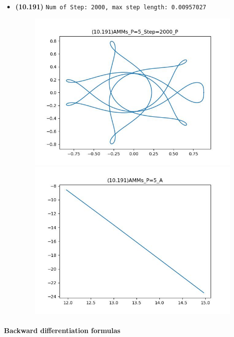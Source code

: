 \documentclass{article}
\begin{document}
\begin{enumerate}
\begin{itemize}
\begin{figure}[h]
        \end{figure}
        \item \textbf{(10.191)} \verb|Num of Step: 2000, max step length: 0.00957027|
        \begin{figure}[h]
            \centering
            \includegraphics[width = 0.45\linewidth]{(10.191)AMMs_P=5_Step=2000_P.jpg}
            \includegraphics[width = 0.45\linewidth]{(10.191)AMMs_P=5_A.jpg}
        \end{figure}
    \end{itemize}
\end{enumerate}

\newpage

\paragraph{Backward differentiation formulas}
\end{document}
